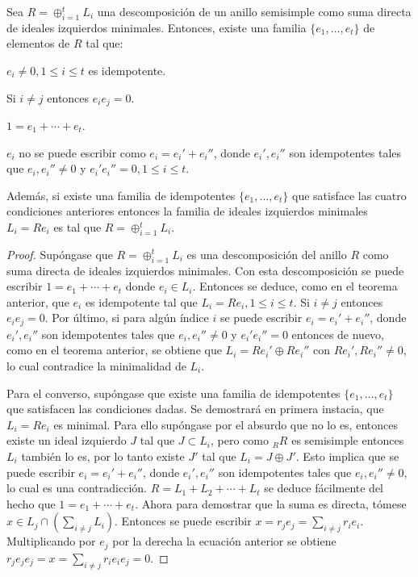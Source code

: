 \begin{teorema}\label{teo:familiaIdempotentes}
Sea $R = \oplus_{i = 1}^t L_i$ una descomposición de un anillo semisimple como suma directa de ideales izquierdos minimales. Entonces, existe una familia $\{e_1, \dots, e_t \}$ de elementos de $R$ tal que:
\begin{bulletList}
\item\label{item:orto1} $e_i \neq 0, 1 \leq i \leq t$ es idempotente.
\item\label{item:orto2} Si $i \neq j$ entonces $e_ie_j = 0$.
\item\label{item:orto3} $1 = e_1 + \cdots + e_t$.
\item\label{item:orto4} $e_i$ no se puede escribir como $e_i = e_i'+ e_i''$, donde $e_i', e_i''$ son idempotentes tales que $e_i, e_i'' \neq 0$ y $e_i'e_i''=0, 1\leq i \leq t$.
\end{bulletList}
Además, si existe una familia de idempotentes $\{e_1, \dots, e_t \}$ que satisface las cuatro condiciones anteriores entonces la familia de ideales izquierdos minimales $L_i = Re_i$ es tal que $R = \oplus_{i=1}^tL_i$.
\end{teorema}
\begin{proof}
Supóngase que $R = \oplus_{i = 1}^tL_i$ es una descomposición del anillo $R$ como suma directa de ideales izquierdos minimales. Con esta descomposición se puede escribir $1 = e_1 + \cdots + e_t$ donde $e_i \in L_i$. Entonces se deduce, como en el teorema anterior, que $e_i$ es idempotente tal que $L_i = Re_i, 1 \leq i \leq t$. Si $i \neq j$ entonces $e_ie_j = 0$. Por último, si para algún índice $i$ se puede escribir $e_i = e_i'+ e_i''$, donde $e_i', e_i''$ son idempotentes tales que $e_i, e_i'' \neq 0$ y $e_i'e_i''=0$ entonces de nuevo, como en el teorema anterior, se obtiene que $L_i = Re_i'\oplus Re_i''$ con $Re_i', Re_i'' \neq 0$, lo cual contradice la minimalidad de $L_i$. 

Para el converso, supóngase que existe una familia de idempotentes $\{ e_1, \dots, e_t \}$ que satisfacen las condiciones dadas. Se demostrará en primera instacia, que $L_i = Re_i$ es minimal. Para ello supóngase por el absurdo que no lo es, entonces existe un ideal izquierdo $J$ tal que $J \subset L_i$, pero como $_RR$ es semisimple entonces $L_i$ también lo es, por lo tanto existe $J'$ tal que $L_i = J\oplus J'$. Esto implica que se puede escribir $e_i = e_i'+ e_i''$, donde $e_i', e_i''$ son idempotentes tales que $e_i, e_i'' \neq 0$, lo cual es una contradicción.
$R = L_1 + L_2 + \cdots + L_t$ se deduce fácilmente del hecho que $1 = e_1 + \cdots + e_t$. Ahora para demostrar que la suma es directa, tómese $x \in L_j \cap \left( \sum_{i \neq j}L_i \right)$. Entonces se puede escribir $x = r_je_j = \sum_{i \neq j}r_ie_i$. Multiplicando por $e_j$ por la derecha la ecuación anterior se obtiene $r_je_je_j = x = \sum_{i \neq j}r_ie_ie_j = 0$.
\end{proof}
